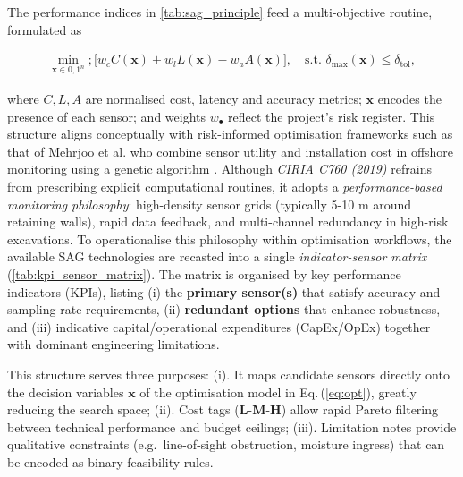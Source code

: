 \documentclass[preprint,11pt,authoryear,3p]{elsarticle}
\begin{document}
The performance indices in \autoref{tab:sag_principle} feed a multi-objective routine, formulated as

\begin{align}
\min_{\mathbf{x}\in{0,1}^n}
; \bigl[w_c C(\mathbf{x}) + w_l L(\mathbf{x}) - w_a A(\mathbf{x}) \bigr],
\quad
\text{s.t. } \delta_{\max}(\mathbf{x}) \le \delta_{\mathrm{tol}},
\label{eq:opt}
\end{align}

where $C, L, A$ are normalised cost, latency and accuracy metrics; $\mathbf{x}$ encodes the presence of each sensor; and weights $w_\bullet$ reflect the project's risk register. This structure aligns conceptually with risk-informed optimisation frameworks such as that of Mehrjoo et al. who combine sensor utility and installation cost in offshore monitoring using a genetic algorithm \citep{MEHRJOO2022108787}. Although \textit{CIRIA C760 (2019)} refrains from prescribing explicit computational routines, it adopts a \emph{performance-based monitoring philosophy}: high-density sensor grids (typically 5-10 m around retaining walls), rapid data feedback, and multi-channel redundancy in high-risk excavations.  
To operationalise this philosophy within optimisation workflows, the available SAG technologies are recasted into a single \emph{indicator-sensor matrix} (\autoref{tab:kpi_sensor_matrix}).  The matrix is organised by key performance indicators (KPIs), listing (i) the \textbf{primary sensor(s)} that satisfy accuracy and sampling-rate requirements, (ii) \textbf{redundant options} that enhance robustness, and (iii) indicative capital/operational expenditures (CapEx/OpEx) together with dominant engineering limitations.  

This structure serves three purposes:  
(i). It maps candidate sensors directly onto the decision variables $\mathbf{x}$ of the optimisation model in Eq.\,(\ref{eq:opt}), greatly reducing the search space;  
(ii). Cost tags (\textbf{L}-\textbf{M}-\textbf{H}) allow rapid Pareto filtering between technical performance and budget ceilings;  
(iii). Limitation notes provide qualitative constraints (e.g.\ line-of-sight obstruction, moisture ingress) that can be encoded as binary feasibility rules.  
\end{document}

